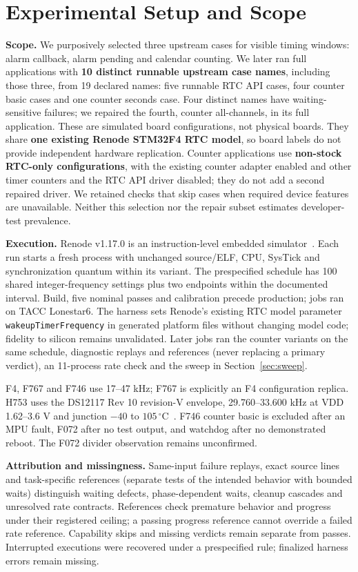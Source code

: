 \documentclass[sigconf,nonacm,balance=false]{acmart}
\begin{document}
\section{Experimental Setup and Scope}
\textbf{Scope.} We purposively selected three upstream cases for visible timing windows: alarm callback, alarm pending and calendar counting. We later ran full applications with \textbf{10 distinct runnable upstream case names}, including those three, from 19 declared names: five runnable RTC API cases, four counter basic cases and one counter seconds case. Four distinct names have waiting-sensitive failures; we repaired the fourth, counter all-channels, in its full application. These are simulated board configurations, not physical boards. They share \textbf{one existing Renode STM32F4 RTC model}, so board labels do not provide independent hardware replication. Counter applications use \textbf{non-stock RTC-only configurations}, with the existing counter adapter enabled and other timer counters and the RTC API driver disabled; they do not add a second repaired driver. We retained checks that skip cases when required device features are unavailable. Neither this selection nor the repair subset estimates developer-test prevalence.

\textbf{Execution.} Renode v1.17.0 is an instruction-level embedded simulator~\cite{renodetime}. Each run starts a fresh process with unchanged source/ELF, CPU, SysTick and synchronization quantum within its variant. The prespecified schedule has 100 shared integer-frequency settings plus two endpoints within the documented interval. Build, five nominal passes and calibration precede production; jobs ran on TACC Lonestar6. The harness sets Renode's existing RTC model parameter \texttt{wakeupTimerFrequency} in generated platform files without changing model code; fidelity to silicon remains unvalidated. Later jobs ran the counter variants on the same schedule, diagnostic replays and references (never replacing a primary verdict), an 11-process rate check and the sweep in Section~\ref{sec:sweep}.

F4, F767 and F746 use 17--47 kHz; F767 is explicitly an F4 configuration replica. H753 uses the DS12117 Rev 10 revision-V envelope, 29.760--33.600 kHz at VDD 1.62--3.6 V and junction $-40$ to $105\,^{\circ}$C~\cite{stm32h753datasheet}. F746 counter basic is excluded after an MPU fault, F072 after no test output, and watchdog after no demonstrated reboot. The F072 divider observation remains unconfirmed.

\textbf{Attribution and missingness.} Same-input failure replays, exact source lines and task-specific references (separate tests of the intended behavior with bounded waits) distinguish waiting defects, phase-dependent waits, cleanup cascades and unresolved rate contracts. References check premature behavior and progress under their registered ceiling; a passing progress reference cannot override a failed rate reference. Capability skips and missing verdicts remain separate from passes. Interrupted executions were recovered under a prespecified rule; finalized harness errors remain missing.
\end{document}
